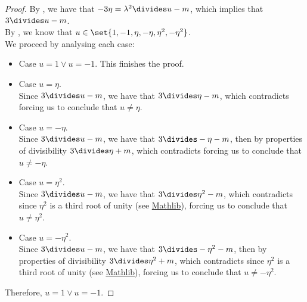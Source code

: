 \begin{proof}
    \leanok
    By , we have that $-3\eta = \lambda^2 \divides u - m$, which implies that
    $3 \divides u - m$.\\
    By , we know that $u \in \set{1, -1, \eta, -\eta, \eta^2, -\eta^2}$. \\
    We proceed by analysing each case:
    \begin{itemize}
        \item Case $u = 1 \lor u = -1$. This finishes the proof.
        \item Case $u = \eta$.\\
              Since $3 \divides u - m$, we have that $3 \divides \eta - m$, which contradicts
               forcing us to conclude that $u \neq \eta$.
        \item Case $u = -\eta$.\\
              Since $3 \divides u - m$, we have that $3 \divides - \eta - m$, then by properties of
              divisibility $3 \divides \eta + m$, which contradicts
               forcing us to conclude that $u \neq -\eta$.
        \item Case $u = \eta^2$.\\
              Since $3 \divides u - m$, we have that $3 \divides \eta^2 - m$, which contradicts
               since $\eta^2$ is a third root of unity
              (see \href{https://pitmonticone.github.io/FLT3/docs/Mathlib/RingTheory/RootsOfUnity/Basic.html#IsPrimitiveRoot.pow_of_coprime}{Mathlib}),
              forcing us to conclude that $u \neq \eta^2$.
        \item Case $u = -\eta^2$.\\
              Since $3 \divides u - m$, we have that $3 \divides - \eta^2 - m$, then by properties of
              divisibility $3 \divides \eta^2 + m$, which contradicts
               since $\eta^2$ is a third root of unity
              (see \href{https://pitmonticone.github.io/FLT3/docs/Mathlib/RingTheory/RootsOfUnity/Basic.html#IsPrimitiveRoot.pow_of_coprime}{Mathlib}),
              forcing us to conclude that $u \neq -\eta^2$.
    \end{itemize}
    Therefore, $u = 1 \lor u = -1$.
\end{proof}

